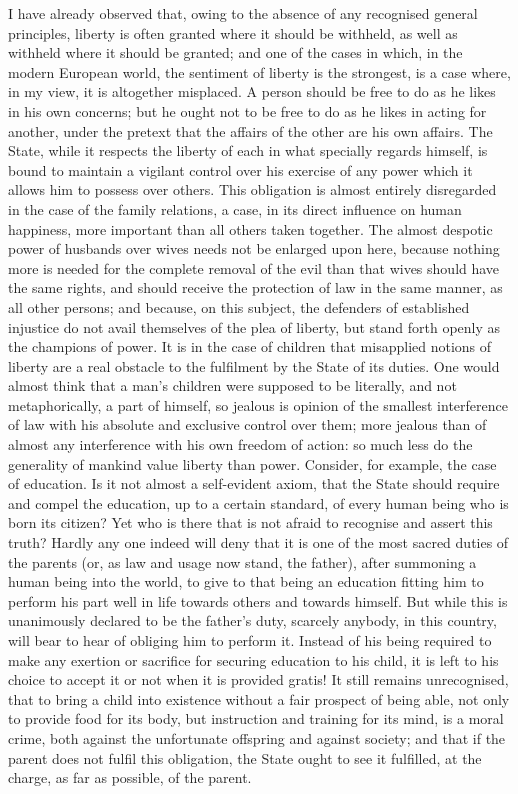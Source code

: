 \documentclass[11pt,openany]{book}
\begin{document}
I have already observed that, owing to the absence of any recognised general principles, liberty is often granted where it should be withheld, as well as withheld where it should be granted; and one of the cases in which, in the modern European world, the sentiment of liberty is the strongest, is a case where, in my view, it is altogether misplaced. A person should be free to do as he likes in his own concerns; but he ought not to be free to do as he likes in acting for another, under the pretext that the affairs of the other are his own affairs. The State, while it respects the liberty of each in what specially regards himself, is bound to maintain a vigilant control over his exercise of any power which it allows him to possess over others. This obligation is almost entirely disregarded in the case of the family relations, a case, in its direct influence on human happiness, more important than all others taken together. The almost despotic power of husbands over wives needs not be enlarged upon here, because nothing more is needed for the complete removal of the evil than that wives should have the same rights, and should receive the protection of law in the same manner, as all other persons; and because, on this subject, the defenders of established injustice do not avail themselves of the plea of liberty, but stand forth openly as the champions of power. It is in the case of children that misapplied notions of liberty are a real obstacle to the fulfilment by the State of its duties. One would almost think that a man's children were supposed to be literally, and not metaphorically, a part of himself, so jealous is opinion of the smallest interference of law with his absolute and exclusive control over them; more jealous than of almost any interference with his own freedom of action: so much less do the generality of mankind value liberty than power. Consider, for example, the case of education. Is it not almost a self-evident axiom, that the State should require and compel the education, up to a certain standard, of every human being who is born its citizen? Yet who is there that is not afraid to recognise and assert this truth? Hardly any one indeed will deny that it is one of the most sacred duties of the parents (or, as law and usage now stand, the father), after summoning a human being into the world, to give to that being an education fitting him to perform his part well in life towards others and towards himself. But while this is unanimously declared to be the father's duty, scarcely anybody, in this country, will bear to hear of obliging him to perform it. Instead of his being required to make any exertion or sacrifice for securing education to his child, it is left to his choice to accept it or not when it is provided gratis! It still remains unrecognised, that to bring a child into existence without a fair prospect of being able, not only to provide food for its body, but instruction and training for its mind, is a moral crime, both against the unfortunate offspring and against society; and that if the parent does not fulfil this obligation, the State ought to see it fulfilled, at the charge, as far as possible, of the parent.
\end{document}
